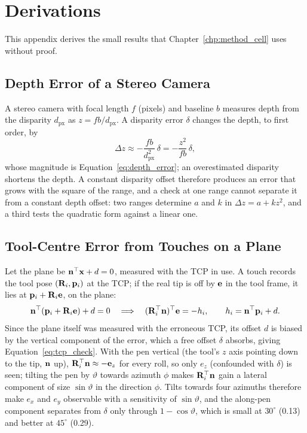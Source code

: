 \section{Derivations}\label{app:derivations}
This appendix derives the small results that Chapter~\ref{chp:method_cell} uses without proof.

\subsection{Depth Error of a Stereo Camera}
A stereo camera with focal length $f$ (pixels) and baseline $b$ measures depth from the disparity
$d_{\mathrm{px}}$ as $z=fb/d_{\mathrm{px}}$. A disparity error $\delta$ changes the depth, to first order, by
\begin{equation}
\Delta z\approx-\frac{fb}{d_{\mathrm{px}}^2}\,\delta=-\frac{z^2}{fb}\,\delta ,
\end{equation}
whose magnitude is Equation~\ref{eq:depth_error}; an overestimated disparity shortens the depth. A
constant disparity offset therefore produces an error that grows with the square of the range, and a
check at one range cannot separate it from a constant depth offset: two ranges determine $a$ and $k$ in
$\Delta z=a+kz^2$, and a third tests the quadratic form against a linear one.

\subsection{Tool-Centre Error from Touches on a Plane}
Let the plane be $\mathbf{n}^{\top}\mathbf{x}+d=0$, measured with the TCP in use. A touch records the
tool pose $(\mathbf{R}_i,\mathbf{p}_i)$ at the TCP; if the real tip is off by $\mathbf{e}$ in the tool
frame, it lies at $\mathbf{p}_i+\mathbf{R}_i\mathbf{e}$, on the plane:
\begin{equation}
\mathbf{n}^{\top}(\mathbf{p}_i+\mathbf{R}_i\mathbf{e})+d=0
\quad\Longrightarrow\quad
(\mathbf{R}_i^{\top}\mathbf{n})^{\top}\mathbf{e}=-h_i,\qquad h_i=\mathbf{n}^{\top}\mathbf{p}_i+d .
\end{equation}
Since the plane itself was measured with the erroneous TCP, its offset $d$ is biased by the vertical
component of the error, which a free offset $\delta$ absorbs, giving Equation~\ref{eq:tcp_check}.
With the pen vertical (the tool's $z$ axis pointing down to the tip, $\mathbf{n}$ up),
$\mathbf{R}_i^{\top}\mathbf{n}\approx-\mathbf{e}_z$ for every roll, so only $e_z$
(confounded with $\delta$) is seen; tilting the pen by $\vartheta$ towards azimuth $\phi$ makes
$\mathbf{R}_i^{\top}\mathbf{n}$ gain a lateral component of size $\sin\vartheta$ in the direction
$\phi$. Tilts towards four azimuths therefore make $e_x$ and $e_y$ observable with a sensitivity of
$\sin\vartheta$, and the along-pen component separates from $\delta$ only through
$1-\cos\vartheta$, which is small at $30^\circ$ (0.13) and better at $45^\circ$ (0.29).

